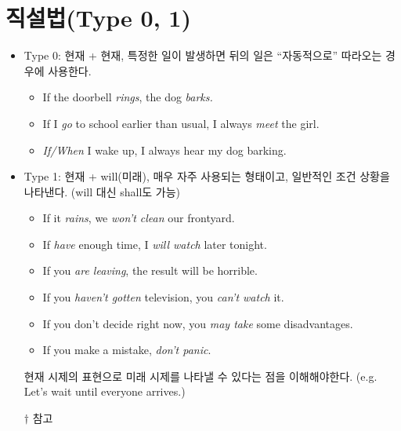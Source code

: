 \documentclass[ a4paper]{oblivoir}
\begin{document}
    \section{직설법(Type 0, 1)}
    \begin{itemize}
        \item Type 0: 현재 + 현재, 특정한 일이 발생하면 뒤의 일은 ``자동적으로''  따라오는 경우에 사용한다.
            \begin{itemize}
                \item If the doorbell \emph{rings}, the dog \emph{barks.} 
                \item If I \emph{go} to school earlier than usual, I always \emph{meet} the girl.
                \item \emph{If/When} I wake up, I always hear my dog barking.
            \end{itemize}
        \item Type 1: 현재 + will(미래), 매우 자주 사용되는 형태이고, 일반적인 조건 상황을 나타낸다. 
        (will 대신 shall도 가능)
            \begin{itemize}
                \item If it \emph{rains}, we \emph{won't clean} our frontyard.
                \item If \emph{have} enough time, I \emph{will watch} later tonight. 
                \item If you \emph{are leaving}, the result will be horrible.
                \item If you \emph{haven't gotten} television, you \emph{can't watch} it.
                \item If you don't decide right now, you \emph{may take} some disadvantages.
                \item If you make a mistake, \emph{don't panic}.
            \end{itemize}
            현재 시제의 표현으로 미래 시제를 나타낼 수 있다는 점을 이해해야한다. (e.g. Let's wait until everyone arrives.)
            
            {\footnotesize $\dagger$ 참고
            
            \begin{enumerate}
            

\end{enumerate}}
\end{itemize}
\end{document}
